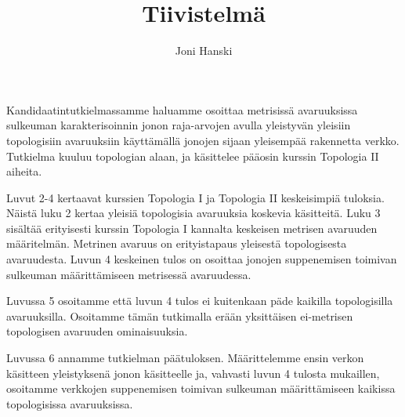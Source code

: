 \documentclass[12pt,a4paper,leqno,notitlepage]{report}
\title{Tiivistelmä}
\author{Joni Hanski}
\begin{document}
\maketitle

Kandidaatintutkielmassamme haluamme osoittaa metrisissä avaruuksissa sulkeuman karakterisoinnin jonon raja-arvojen avulla yleistyvän yleisiin topologisiin avaruuksiin käyttämällä jonojen sijaan yleisempää rakennetta verkko. Tutkielma kuuluu topologian alaan, ja käsittelee pääosin kurssin Topologia II aiheita.

Luvut 2-4 kertaavat kurssien Topologia I ja Topologia II keskeisimpiä tuloksia. Näistä luku 2 kertaa yleisiä topologisia avaruuksia koskevia käsitteitä. Luku 3 sisältää erityisesti kurssin Topologia I kannalta keskeisen metrisen avaruuden määritelmän. Metrinen avaruus on erityistapaus yleisestä topologisesta avaruudesta. Luvun 4 keskeinen tulos on osoittaa jonojen suppenemisen toimivan sulkeuman määrittämiseen metrisessä avaruudessa.

Luvussa 5 osoitamme että luvun 4 tulos ei kuitenkaan päde kaikilla topologisilla avaruuksilla. Osoitamme tämän tutkimalla erään yksittäisen ei-metrisen topologisen avaruuden ominaisuuksia.

Luvussa 6 annamme tutkielman päätuloksen. Määrittelemme ensin verkon käsitteen yleistyksenä jonon käsitteelle ja, vahvasti luvun 4 tulosta mukaillen, osoitamme verkkojen suppenemisen toimivan sulkeuman määrittämiseen kaikissa topologisissa avaruuksissa.
\end{document}
